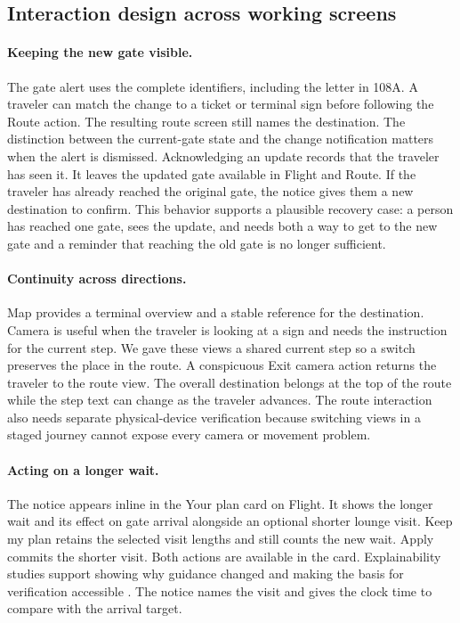 \documentclass[sigconf,nonacm,balance=false]{acmart}
\begin{document}
\subsection{Interaction design across working screens}
\paragraph{Keeping the new gate visible.} The gate alert uses the complete identifiers, including the letter in 108A. A traveler can match the change to a ticket or terminal sign before following the Route action. The resulting route screen still names the destination. The distinction between the current-gate state and the change notification matters when the alert is dismissed. Acknowledging an update records that the traveler has seen it. It leaves the updated gate available in Flight and Route. If the traveler has already reached the original gate, the notice gives them a new destination to confirm. This behavior supports a plausible recovery case: a person has reached one gate, sees the update, and needs both a way to get to the new gate and a reminder that reaching the old gate is no longer sufficient.

\paragraph{Continuity across directions.} Map provides a terminal overview and a stable reference for the destination. Camera is useful when the traveler is looking at a sign and needs the instruction for the current step. We gave these views a shared current step so a switch preserves the place in the route. A conspicuous Exit camera action returns the traveler to the route view. The overall destination belongs at the top of the route while the step text can change as the traveler advances. The route interaction also needs separate physical-device verification because switching views in a staged journey cannot expose every camera or movement problem.

\paragraph{Acting on a longer wait.} The notice appears inline in the Your plan card on Flight. It shows the longer wait and its effect on gate arrival alongside an optional shorter lounge visit. Keep my plan retains the selected visit lengths and still counts the new wait. Apply commits the shorter visit. Both actions are available in the card. Explainability studies support showing why guidance changed and making the basis for verification accessible \cite{ref7,ref220}. The notice names the visit and gives the clock time to compare with the arrival target.
\end{document}
